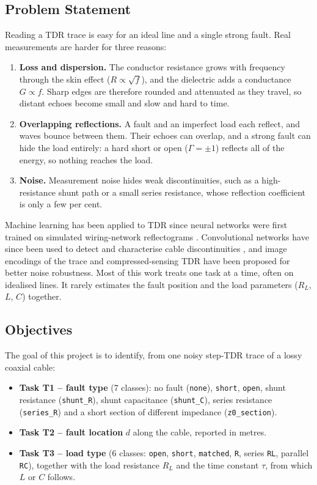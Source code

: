 \subsection{Problem Statement}
Reading a TDR trace is easy for an ideal line and a single strong fault. Real measurements are harder for three reasons:
\begin{enumerate}
    \item \textbf{Loss and dispersion.} The conductor resistance grows with frequency through the skin effect ($R \propto \sqrt{f}$), and the dielectric adds a conductance $G \propto f$. Sharp edges are therefore rounded and attenuated as they travel, so distant echoes become small and slow and hard to time.
    \item \textbf{Overlapping reflections.} A fault and an imperfect load each reflect, and waves bounce between them. Their echoes can overlap, and a strong fault can hide the load entirely: a hard short or open ($\Gamma = \pm 1$) reflects all of the energy, so nothing reaches the load.
    \item \textbf{Noise.} Measurement noise hides weak discontinuities, such as a high-resistance shunt path or a small series resistance, whose reflection coefficient is only a few per cent.
\end{enumerate}
Machine learning has been applied to TDR since neural networks were first trained on simulated wiring-network reflectograms \cite{smail2011detection}. Convolutional networks have since been used to detect and characterise cable discontinuities \cite{scarpetta2021detection,novel2025wiring}, and image encodings of the trace \cite{goudjil2026wiring} and compressed-sensing TDR \cite{ieee2024cs_tdr} have been proposed for better noise robustness. Most of this work treats one task at a time, often on idealised lines. It rarely estimates the fault position and the load parameters ($R_L$, $L$, $C$) together.

\subsection{Objectives}
The goal of this project is to identify, from one noisy step-TDR trace of a lossy coaxial cable:
\begin{itemize}
    \item \textbf{Task T1 -- fault type} (7 classes): no fault (\texttt{none}), \texttt{short}, \texttt{open}, shunt resistance (\texttt{shunt\_R}), shunt capacitance (\texttt{shunt\_C}), series resistance (\texttt{series\_R}) and a short section of different impedance (\texttt{z0\_section}).
    \item \textbf{Task T2 -- fault location} $d$ along the cable, reported in metres.
    \item \textbf{Task T3 -- load type} (6 classes: \texttt{open}, \texttt{short}, \texttt{matched}, \texttt{R}, series \texttt{RL}, parallel \texttt{RC}), together with the load resistance $R_L$ and the time constant $\tau$, from which $L$ or $C$ follows.
\end{itemize}

